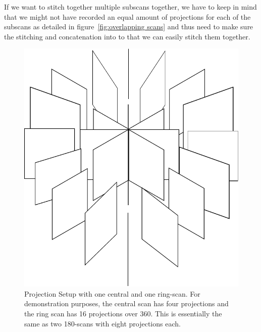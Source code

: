 If we want to stitch together multiple subscans together, we have to keep in mind that we might not have recorded an equal amount of projections for each of the subscans as detailed in figure~\ref{fig:overlapping scans} and thus need to make sure the stitching and concatenation into to that we can easily stitch them together.

\begin{figure}[p]
	\centering
		\includegraphics[width=\imsize]{img/projections}
	\caption{Projection Setup with one central and one ring-scan. For demonstration purposes, the central scan has four projections and the ring scan has 16 projections over \unit{360}{\degree}. This is essentially the same as two \unit{180}{\degree}-scans with eight projections each.}
	\label{fig:projections}
\end{figure}